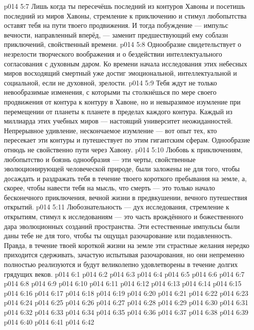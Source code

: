 \vs p014 5:7 Лишь когда ты пересечёшь последний из контуров Хавоны и посетишь последний из миров Хавоны, стремление к приключению и стимул любопытства оставят тебя на пути твоего продвижения. И тогда побуждение --- импульс вечности, направленный вперёд, --- заменит предшествующий ему соблазн приключений, свойственный времени.
\vs p014 5:8 Однообразие свидетельствует о незрелости творческого воображения и о бездействии интеллектуального согласования с духовным даром. Ко времени начала исследования этих небесных миров восходящий смертный уже достиг эмоциональной, интеллектуальной и социальной, если не духовной, зрелости.
\vs p014 5:9 Тебя ждут не только невообразимые изменения, с которыми ты столкнёшься по мере своего продвижения от контура к контуру в Хавоне, но и невыразимое изумление при перемещении от планеты к планете в пределах каждого контура. Каждый из миллиарда этих учебных миров --- настоящий университет неожиданностей. Непрерывное удивление, нескончаемое изумление --- вот опыт тех, кто пересекает эти контуры и путешествует по этим гигантским сферам. Однообразие отнюдь не свойственно пути через Хавону.
\vs p014 5:10 Любовь к приключениям, любопытство и боязнь однообразия --- эти черты, свойственные эволюционирующей человеческой природе, были заложены не для того, чтобы досаждать и раздражать тебя в течение твоего короткого пребывания на земле, а, скорее, чтобы навести тебя на мысль, что смерть --- это только начало бесконечного приключения, вечной жизни в предвкушении, вечного путешествия открытий.
\vs p014 5:11 Любознательность --- дух исследования, стремление к открытиям, стимул к исследованиям --- это часть врождённого и божественного дара эволюционных созданий пространства. Эти естественные импульсы были даны тебе не для того, чтобы ты ощущал разочарование или подавленность. Правда, в течение твоей короткой жизни на земле эти страстные желания нередко приходится сдерживать, зачастую испытывая разочарования, но они непременно полностью реализуются и будут великолепно удовлетворены в течение долгих грядущих веков.
\vs p014 6:1 
\vs p014 6:2 
\vs p014 6:3 
\vs p014 6:4 
\vs p014 6:5 \pc 
\vs p014 6:6 
\vs p014 6:7 
\vs p014 6:8 
\vs p014 6:9 
\vs p014 6:10 
\vs p014 6:11 
\vs p014 6:12 
\vs p014 6:13 
\vs p014 6:14 
\vs p014 6:15 
\vs p014 6:16 
\vs p014 6:17 
\vs p014 6:18 
\vs p014 6:19 
\vs p014 6:20 
\vs p014 6:21 
\vs p014 6:22 
\vs p014 6:23 
\vs p014 6:24 
\vs p014 6:25 
\vs p014 6:26 
\vs p014 6:27 
\vs p014 6:28 
\vs p014 6:29 
\vs p014 6:30 
\vs p014 6:31 
\vs p014 6:32 
\vs p014 6:33 
\vs p014 6:34 
\vs p014 6:35 
\vs p014 6:36 
\vs p014 6:37 
\vs p014 6:38 
\vs p014 6:39 
\vs p014 6:40 
\vs p014 6:41 \pc 
\vsetoff
\vs p014 6:42 
\quizlink

